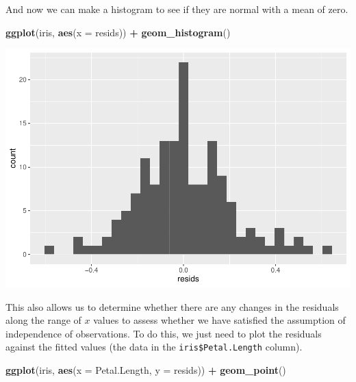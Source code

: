 \documentclass[
]{book}
\newenvironment{Shaded}{\begin{snugshade}}{\end{snugshade}}
\newcommand{\DataTypeTok}[1]{\textcolor[rgb]{0.13,0.29,0.53}{#1}}
\newcommand{\KeywordTok}[1]{\textcolor[rgb]{0.13,0.29,0.53}{\textbf{#1}}}
\newcommand{\NormalTok}[1]{#1}
\newcommand{\OperatorTok}[1]{\textcolor[rgb]{0.81,0.36,0.00}{\textbf{#1}}}
\newcommand{\StringTok}[1]{\textcolor[rgb]{0.31,0.60,0.02}{#1}}
\begin{document}
\begin{Shaded}
\end{Shaded}

And now we can make a histogram to see if they are normal with a mean of zero.

\begin{Shaded}
\begin{Highlighting}[]
\KeywordTok{ggplot}\NormalTok{(iris, }\KeywordTok{aes}\NormalTok{(}\DataTypeTok{x =}\NormalTok{ resids)) }\OperatorTok{+}
\StringTok{  }\KeywordTok{geom_histogram}\NormalTok{()}
\end{Highlighting}
\end{Shaded}

\includegraphics{worstr_files/figure-latex/unnamed-chunk-222-1.pdf}

This also allows us to determine whether there are any changes in the residuals along the range of \(x\) values to assess whether we have satisfied the assumption of independence of observations. To do this, we just need to plot the residuals against the fitted values (the data in the \texttt{iris\$Petal.Length} column).

\begin{Shaded}
\begin{Highlighting}[]
\KeywordTok{ggplot}\NormalTok{(iris, }\KeywordTok{aes}\NormalTok{(}\DataTypeTok{x =}\NormalTok{ Petal.Length, }\DataTypeTok{y =}\NormalTok{ resids)) }\OperatorTok{+}
\StringTok{  }\KeywordTok{geom_point}\NormalTok{() }
\end{Highlighting}
\end{Shaded}
\end{document}
